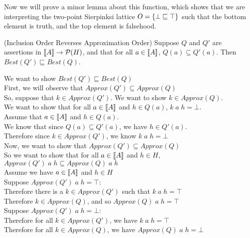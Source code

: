 Now we will prove a minor lemma about this function, which shows that
we are interpreting the two-point Sierpinksi lattice $O = \{{\bot
  \sqsubseteq \top}\}$ such that the bottom element is truth, and the
top element is falsehood.

\begin{lemma}{(Inclusion Order Reverses Approximation Order)}
Suppose $Q$ and $Q'$ are assertions in $[\![{A}]\!] \to \mathcal{P}(H)$, and
that for all $a \in [\![{A}]\!]$, $Q(a) \subseteq Q'(a)$. Then
$\mathit{Best}(Q') \sqsubseteq \mathit{Best}(Q)$.
\end{lemma}

\begin{tabbedproof}
\oo We want to show $\mathit{Best}(Q') \sqsubseteq \mathit{Best}(Q)$ \\
\oo First, we will observe that $\mathit{Approx}(Q') \subseteq \mathit{Approx}(Q)$ \\
\oo So, suppose that $k \in \mathit{Approx}(Q')$. We want to show $k \in \mathit{Approx}(Q)$. \\
\ooo We want to show that for all $a \in [\![{A}]\!]$ and $h \in Q(a)$, $k\;a\;h = \bot$.  \\
\ooo Assume that $a \in [\![{A}]\!]$ and $h \in Q(a)$. \\ 
\oooo We know that since $Q(a) \subseteq Q'(a)$, we have $h \in Q'(a)$.  \\
\oooo Therefore since $k \in \mathit{Approx}(Q')$, we know $k\;a\;h = \bot$ \\
\oo Now, we want to show that $\mathit{Approx}(Q') \subseteq \mathit{Approx}(Q)$ \\
\oo So we want to show that for all $a \in [\![{A}]\!]$ and $h \in H$, $\mathit{Approx}(Q')\;a\;h \subseteq \mathit{Approx}(Q)\;a\;h$ \\
\oo Assume we have $a \in [\![{A}]\!]$ and $h \in H$ \\
\ooo Suppose $\mathit{Approx}(Q')\;a\;h = \top$: \\
\oooo Therefore there is a $k\in\mathit{Approx}(Q')$ such that $k\;a\;h = \top$ \\
\oooo Therefore $k \in \mathit{Approx}(Q)$, and so $\mathit{Approx}(Q)\;a\;h = \top$ \\
\ooo Suppose $\mathit{Approx}(Q')\;a\;h = \bot$: \\
\oooo Therefore for all $k \in \mathit{Approx}(Q')$, we have $k\;a\;h = \top$ \\
\oooo Therefore for all $k \in \mathit{Approx}(Q)$, we have $\mathit{Approx}(Q)\;a\;h = \bot$ \\

\end{tabbedproof}

